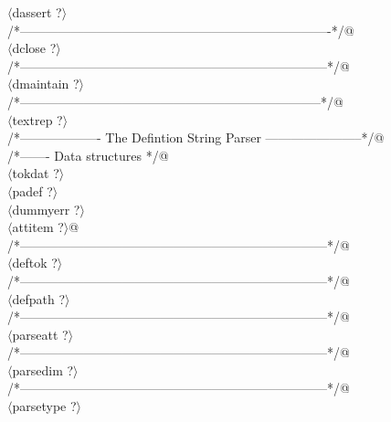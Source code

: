 \documentclass[12pt]{article}
\begin{document}
{\begin{flushleft}
\begin{minipage}{\linewidth}
\begin{list}{}{}
\mbox{}\verb@@$\langle$dassert {\footnotesize ?}$\rangle$\verb@@\\
\mbox{}\verb@/*-------------------------------------------------------------------------*/@\\
\mbox{}\verb@@$\langle$dclose {\footnotesize ?}$\rangle$\verb@@\\
\mbox{}\verb@/*------------------------------------------------------------------------*/@\\
\mbox{}\verb@@$\langle$dmaintain {\footnotesize ?}$\rangle$\verb@@\\
\mbox{}\verb@/*-----------------------------------------------------------------------*/@\\
\mbox{}\verb@@$\langle$textrep {\footnotesize ?}$\rangle$\verb@@\\
\mbox{}\verb@/*------------------- The Defintion String Parser -----------------------*/@\\
\mbox{}\verb@/*------- Data structures */@\\
\mbox{}\verb@@$\langle$tokdat {\footnotesize ?}$\rangle$\verb@@\\
\mbox{}\verb@@$\langle$padef {\footnotesize ?}$\rangle$\verb@@\\
\mbox{}\verb@@$\langle$dummyerr {\footnotesize ?}$\rangle$\verb@@\\
\mbox{}\verb@@$\langle$attitem {\footnotesize ?}$\rangle$\verb@ @\\
\mbox{}\verb@/*------------------------------------------------------------------------*/@\\
\mbox{}\verb@@$\langle$deftok {\footnotesize ?}$\rangle$\verb@@\\
\mbox{}\verb@/*------------------------------------------------------------------------*/@\\
\mbox{}\verb@@$\langle$defpath {\footnotesize ?}$\rangle$\verb@@\\
\mbox{}\verb@/*------------------------------------------------------------------------*/@\\
\mbox{}\verb@@$\langle$parseatt {\footnotesize ?}$\rangle$\verb@@\\
\mbox{}\verb@/*------------------------------------------------------------------------*/@\\
\mbox{}\verb@@$\langle$parsedim {\footnotesize ?}$\rangle$\verb@@\\
\mbox{}\verb@/*------------------------------------------------------------------------*/@\\
\mbox{}\verb@@$\langle$parsetype {\footnotesize ?}$\rangle$\verb@@\\

\end{list}
\end{minipage}
\end{flushleft}}
\end{document}
